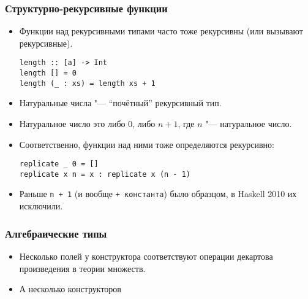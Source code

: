 \documentclass[10pt]{beamer}
\begin{document}
\begin{frame}[fragile]
  \frametitle{Структурно-рекурсивные функции}
  \begin{itemize}
    \item Функции над рекурсивными типами часто тоже рекурсивны (или вызывают рекурсивные).
          \begin{lstlisting}
length :: [a] -> Int
length [] = 0
length (_ : xs) = length xs + 1
\end{lstlisting}
    \item Натуральные числа "--- \enquote{почётный} рекурсивный тип.
          \pause
    \item Натуральное число это либо $0$, либо $n + 1$, где $n$ "--- натуральное число.
    \item Соответственно, функции над ними тоже определяются рекурсивно:
          \begin{lstlisting}
replicate _ 0 = []
replicate x n = x : replicate x (n - 1)
\end{lstlisting}
    \item Раньше \lstinline|n + 1| (и вообще \lstinline|+ константа|) было образцом, в Haskell 2010 их исключили.
  \end{itemize}
\end{frame}

\begin{frame}[fragile]
  \frametitle{Алгебраические типы}
  \begin{itemize}
    \item Несколько полей у конструктора соответствуют операции декартова произведения в теории множеств.
    \item А несколько конструкторов
  \end{itemize}
\end{frame}
\end{document}
